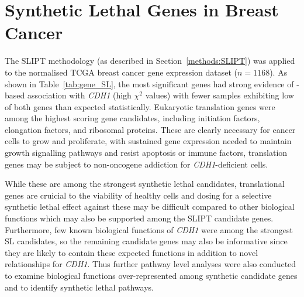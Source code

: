 \section{Synthetic Lethal Genes in Breast Cancer} \label{chapt3:exprSL_genes}

The \gls{SLIPT} methodology (as described in Section~\ref{methods:SLIPT}) was applied to the normalised \gls{TCGA} breast cancer \gls{gene expression} dataset ($n = 1168$). As shown in Table~\ref{tab:gene_SL}, the most significant genes had strong evidence of -based association with \textit{CDH1} (high $\chi^2$ values) with fewer samples exhibiting low  of both genes than expected statistically. Eukaryotic translation genes were among the highest scoring gene candidates, including initiation factors, elongation factors, and ribosomal proteins. These are clearly necessary for cancer cells to grow and proliferate, with sustained \gls{gene expression} needed to maintain growth signalling \glspl{pathway} and resist apoptosis or immune factors, translation genes may be subject to \gls{non-oncogene addiction} for \textit{CDH1}-deficient cells.

While these are among the strongest \gls{synthetic lethal} candidates, translational genes are cruicial to the viability of healthy cells and dosing for a selective \gls{synthetic lethal} effect against these may be difficult compared to other biological functions which may also be supported among the \gls{SLIPT} candidate genes. Furthermore, few known biological functions of \textit{CDH1} were among the strongest SL candidates, so the remaining candidate genes may also be informative since they are likely to contain these expected functions in addition to novel relationships for \textit{CDH1}. Thus further \gls{pathway} level analyses were also conducted to examine biological functions over-represent\-ed among synthetic candidate genes and to identify \gls{synthetic lethal} \glspl{pathway}.

